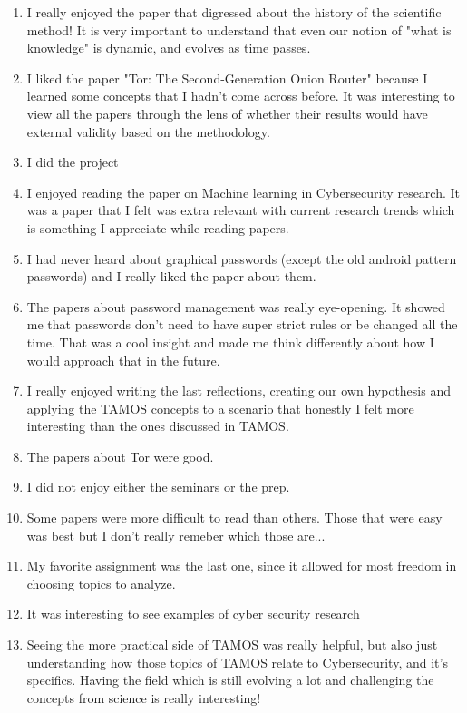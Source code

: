 \documentclass[a4paper]{report}
\begin{document}
\begin{enumerate}
  \item I really enjoyed the paper that digressed about the history of the scientific method! It is very important to understand that even our notion of "what is knowledge" is dynamic, and evolves as time passes.
  \item I liked the paper "Tor: The Second-Generation Onion Router" because I learned some concepts that I hadn't come across before. It was interesting to view all the papers through the lens of whether their results would have external validity based on the methodology.
  \item I did the project
  \item I enjoyed reading the paper on Machine learning in Cybersecurity research. It was a paper that I felt was extra relevant with current research trends which is something I appreciate while reading papers.
  \item I had never heard about graphical passwords (except the old android pattern passwords) and I really liked the paper about them.
  \item The papers about password management was really eye-opening. It showed me that passwords don’t need to have super strict rules or be changed all the time. That was a cool insight and made me think differently about how I would approach that in the future.
  \item I really enjoyed writing the last reflections, creating our own hypothesis and applying the TAMOS concepts to a scenario that honestly I felt more interesting than the ones discussed in TAMOS.
  \item The papers about Tor were good.
  \item I did not enjoy either the seminars or the prep.
  \item Some papers were more difficult to read than others. Those that were easy was best but I don't really remeber which those are...
  \item My favorite assignment was the last one, since it allowed for most freedom in choosing topics to analyze.
  \item It was interesting to see examples of cyber security research
  \item Seeing the more practical side of TAMOS was really helpful, but also just understanding how those topics of TAMOS relate to Cybersecurity, and it's specifics. Having the field which is still evolving a lot and challenging the concepts from science is really interesting!

\end{enumerate}
\end{document}
